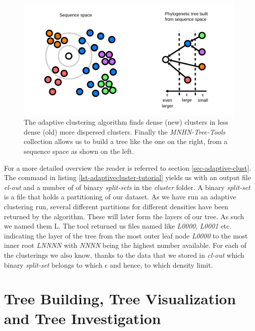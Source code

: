 \begin{figure}
  \includegraphics{densities-space.pdf}
  \caption{The adaptive clustering algorithm finds dense (new)
    clusters in less dense (old) more dispersed clusters. Finally the
    \emph{MNHN-Tree-Tools} collection allows us to build a tree like
    the one on the right, from a sequence space as shown on the
    left.}
  \label{fig-adaptive-cluster}
\end{figure}
For a more detailed overview the reader is referred to section
\ref{sec-adaptive-clust}. The command in listing
\ref{lst-adaptivecluster-tutorial} yields us 
with an output file \emph{cl-out} and a number of of binary
\emph{split-sets} in the
\emph{cluster} folder. A binary \emph{split-set} is a file that holds
a partitioning of our dataset. As we have run an adaptive clustering
run, several different partitions for different densities have been
returned by the algorithm. These will later form the layers of our
tree. As such we named them L. The tool returned us files named like
\emph{L0000}, \emph{L0001} etc. indicating the layer of
the tree from the most outer leaf node \emph{L0000} to the most inner
root \emph{LNNNN} with \emph{NNNN} being the highest number
available. For each of the clusterings we also know, thanks to the
data that we stored in \emph{cl-out} which binary \emph{split-set}
belongs to which $\epsilon$ and hence, to which density limit.

\section{Tree Building, Tree Visualization and Tree Investigation}

